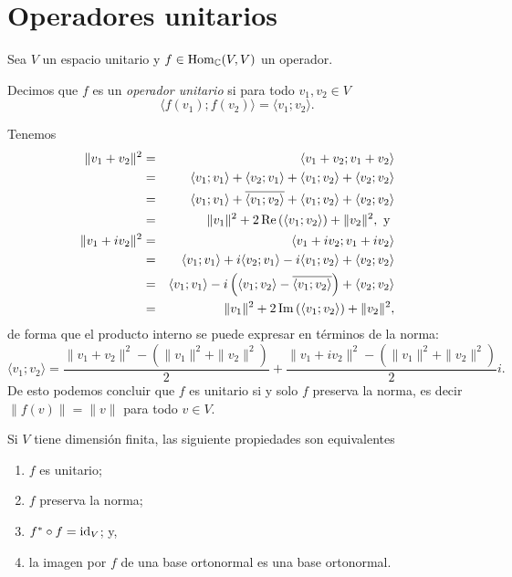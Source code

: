 \section{Operadores unitarios}

Sea $V$ un espacio unitario y $f\in\operatorname{Hom}_\mathbb{C}(V,V)$ un operador.

\begin{defn}
Decimos que $f$ es un \emph{operador unitario} si para todo $v_1,v_2\in V$
\[
\langle f(v_1);f(v_2) \rangle =\langle v_1;v_2\rangle.
\]
\end{defn}

\begin{obs}
Tenemos
\begin{eqnarray*}
\|v_1+v_2\|^2 & = & \langle v_1+v_2;v_1+v_2 \rangle\\
 & = & \langle v_1;v_1\rangle+\langle v_2;v_1\rangle+\langle v_1;v_2\rangle+\langle v_2;v_2\rangle\\
 & = & \langle v_1;v_1\rangle+\overline{\langle v_1;v_2\rangle}+\langle v_1;v_2\rangle+\langle v_2;v_2\rangle\\
 & = & \|v_1\|^2+2\operatorname{Re}\left(\langle v_1;v_2\rangle\right)+\|v_2\|^2,\textrm{ y }\\
\|v_1+iv_2\|^2 & = & \langle v_1+iv_2;v_1+iv_2 \rangle\\
 & = & \langle v_1;v_1\rangle+i\langle v_2;v_1\rangle-i\langle v_1;v_2\rangle+\langle v_2;v_2\rangle\\
 & = & \langle v_1;v_1\rangle-i\left(\langle v_1;v_2\rangle-\overline{\langle v_1;v_2\rangle}\right)+\langle v_2;v_2\rangle\\
 & = & \|v_1\|^2+2\operatorname{Im}\left(\langle v_1;v_2\rangle\right)+\|v_2\|^2,
\end{eqnarray*}
de forma que el producto interno se puede expresar en t\'erminos de la norma:
\[
\langle v_1;v_2\rangle=\frac{\|v_1+v_2\|^2-\left(\|v_1\|^2+\|v_2\|^2\right)}{2} + \frac{\|v_1+iv_2\|^2-\left(\|v_1\|^2+\|v_2\|^2\right)}{2}i.
\]
De esto podemos concluir que $f$ es unitario si y solo $f$ preserva la norma, es decir $\|f(v)\|=\|v\|$ para todo $v\in V$.
\end{obs}

\begin{prop}
Si $V$ tiene dimensi\'on finita, las siguiente propiedades son equivalentes
\begin{enumerate}
\item $f$ es unitario;
\item $f$ preserva la norma;
\item $f^*\circ f=\operatorname{id}_V$; y,
\item la imagen por $f$ de una base ortonormal es una base ortonormal.
\end{enumerate}
\end{prop}

